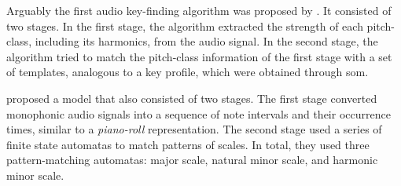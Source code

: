



Arguably the first audio key-finding algorithm was proposed
by \textcite{leman1992een}. It consisted of two stages. In
the first stage, the algorithm extracted the strength of
each pitch-class, including its harmonics, from the audio
signal. In the second stage, the algorithm tried to match
the pitch-class information of the first stage with a set of
templates, analogous to a key profile, which were obtained
through \acrfull{som}.


\textcite{izmirli1994recognition} proposed a model that also
consisted of two stages. The first stage converted
monophonic audio signals into a sequence of note intervals
and their occurrence times, similar to a \emph{piano-roll}
representation. The second stage used a series of finite
state automatas to match patterns of scales. In total, they
used three pattern-matching automatas: major scale, natural
minor scale, and harmonic minor scale.

